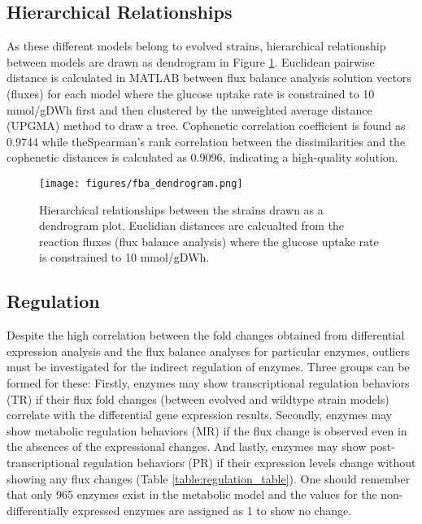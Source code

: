  \subsection{Hierarchical Relationships}

As these different models belong to evolved strains, hierarchical relationship between models are drawn as dendrogram in Figure \ref{fig:fba_dendrogram}. Euclidean pairwise distance is calculated in MATLAB between flux balance analysis solution vectors (fluxes) for each model where the glucose uptake rate is constrained to 10 mmol/gDWh first and then clustered by the unweighted average distance (UPGMA) method to draw a tree. Cophenetic correlation coefficient is found as 0.9744 while theSpearman's rank correlation between the dissimilarities and the cophenetic distances is calculated as 0.9096, indicating a high-quality solution.

\begin{figure}[H]
  \begin{center}
  \texttt{[image: figures/fba\_dendrogram.png]}
  \caption[Hierarchical relationships between the strains drawn as a dendrogram plot. Euclidian distances are calcualted from the reaction fluxes (flux balance analysis) where the glucose uptake rate is constrained to 10 mmol/gDWh]{Hierarchical relationships between the strains drawn as a dendrogram plot. Euclidian distances are calcualted from the reaction fluxes (flux balance analysis) where the glucose uptake rate is constrained to 10 mmol/gDWh.}
  \label{fig:fba_dendrogram}
  \end{center}
\end{figure}

\subsection{Regulation}

Despite the high correlation between the fold changes obtained from differential expression analysis and the flux balance analyses for particular enzymes, outliers must be investigated for the indirect regulation of enzymes. Three groups can be formed for these: Firstly, enzymes may show transcriptional regulation behaviors (TR) if their flux fold changes (between evolved and wildtype strain models) correlate with the differential gene expression results. Secondly, enzymes may show metabolic regulation behaviors (MR) if the flux change is observed even in the absences of the expressional changes. And lastly, enzymes may show post-transcriptional regulation behaviors (PR) if their expression levels change without showing any flux changes (Table \ref{table:regulation_table}). One should remember that only 965 enzymes exist in the metabolic model and the values for the non-differentially expressed enzymes are assigned as 1 to show no change.


